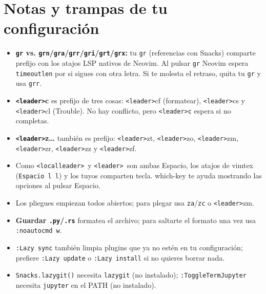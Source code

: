 \documentclass[8pt,a4paper,landscape]{extarticle}
\newcommand{\kk}[1]{\texttt{#1}}
\newcommand{\ld}{\texttt{<leader>}}
\newcommand{\lld}{\texttt{<localleader>}}
\let\oldsection\section
\renewcommand{\section}{\Needspace{10\baselineskip}\oldsection}
\begin{document}
\section{Notas y trampas de tu configuración}
\begin{itemize}
  \item \textbf{\kk{gr} vs. \kk{grn}/\kk{gra}/\kk{grr}/\kk{gri}/\kk{grt}/\kk{grx}:} tu \kk{gr} (referencias con Snacks) comparte prefijo con los atajos LSP nativos de Neovim. Al pulsar \kk{gr} Neovim espera \kk{timeoutlen} por si sigues con otra letra. Si te molesta el retraso, quita tu \kk{gr} y usa \kk{grr}.
  \item \textbf{\ld c} es prefijo de tres cosas: \ld cf (formatear), \ld cs y \ld cl (Trouble). No hay conflicto, pero \kk{\ld c} espera si no completas.
  \item \textbf{\ld z\ldots} también es prefijo: \ld zt, \ld zo, \ld zm, \ld zr, \ld zz y \ld zf.
  \item Como \lld\ y \ld\ son ambas Espacio, los atajos de vimtex (\kk{Espacio l l}) y los tuyos comparten tecla. which-key te ayuda mostrando las opciones al pulsar Espacio.
  \item Los pliegues empiezan todos abiertos; para plegar usa \kk{za}/\kk{zc} o \ld zm.
    \item \textbf{Guardar \kk{.py}/\kk{.rs}} formatea el archivo; para saltarte el formato una vez usa \kk{:noautocmd w}.
  \item \kk{:Lazy sync} también limpia plugins que ya no estén en tu configuración; prefiere \kk{:Lazy update} o \kk{:Lazy install} si no quieres borrar nada.
  \item \kk{Snacks.lazygit()} necesita \kk{lazygit} (no instalado); \kk{:ToggleTermJupyter} necesita \kk{jupyter} en el PATH (no instalado).
\end{itemize}
\end{document}
